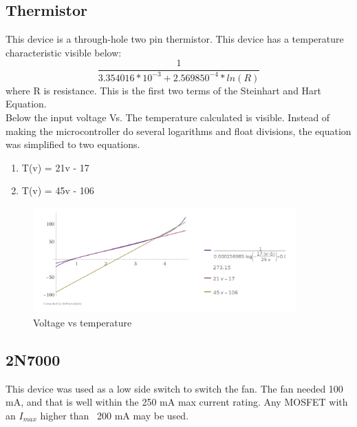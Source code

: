\documentclass{hitec}
\begin{document}
\subsection{Thermistor}
This device is a through-hole two pin thermistor. This device has a temperature characteristic visible below:
\begin{equation}
\frac{1}{3.354016*10^{-3}+2.569850^{-4}*ln(R)}
\end{equation}
where R is resistance. This is the first two terms of the Steinhart and Hart Equation.
\\
Below the input voltage Vs. The temperature calculated is visible. Instead of making the microcontroller do several logarithms and float divisions, the equation was simplified to two equations. 
\begin{enumerate}
\item {T(v) = 21v - 17}
\item {T(v) = 45v - 106}
\end{enumerate}

\begin{figure}[H]
\centering
\includegraphics[width=0.9\textwidth]{characteristics.png}
\caption{Voltage vs temperature}
\label{fig:temp}
\end{figure}
\subsection{2N7000}
This device was used as a low side switch to switch the fan. The fan needed 100 mA, and that is well within the 250 mA max current rating. Any MOSFET with an $I_{max}$ higher than ~200 mA may be used.
\end{document}

